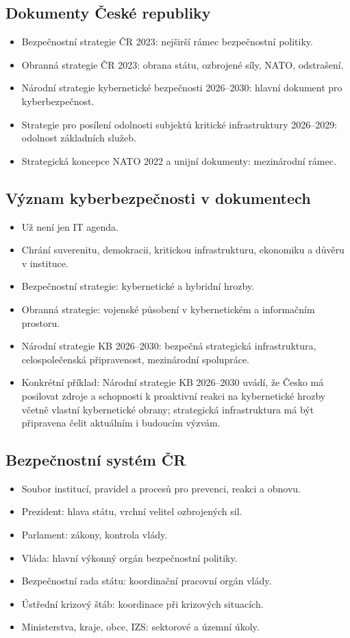 \documentclass[10pt,a4paper]{article}
\newcommand{\blok}[1]{\subsection*{#1}}
\begin{document}
\blok{Dokumenty České republiky}
\begin{itemize}
  \item Bezpečnostní strategie ČR 2023: nejširší rámec bezpečnostní politiky.
  \item Obranná strategie ČR 2023: obrana státu, ozbrojené síly, NATO, odstrašení.
  \item Národní strategie kybernetické bezpečnosti 2026--2030: hlavní dokument pro kyberbezpečnost.
  \item Strategie pro posílení odolnosti subjektů kritické infrastruktury 2026--2029: odolnost základních služeb.
  \item Strategická koncepce NATO 2022 a unijní dokumenty: mezinárodní rámec.
\end{itemize}

\blok{Význam kyberbezpečnosti v dokumentech}
\begin{itemize}
  \item Už není jen IT agenda.
  \item Chrání suverenitu, demokracii, kritickou infrastrukturu, ekonomiku a důvěru v instituce.
  \item Bezpečnostní strategie: kybernetické a hybridní hrozby.
  \item Obranná strategie: vojenské působení v kybernetickém a informačním prostoru.
  \item Národní strategie KB 2026--2030: bezpečná strategická infrastruktura, celospolečenská připravenost, mezinárodní spolupráce.
  \item Konkrétní příklad: Národní strategie KB 2026--2030 uvádí, že Česko má posilovat zdroje a schopnosti k proaktivní reakci na kybernetické hrozby včetně vlastní kybernetické obrany; strategická infrastruktura má být připravena čelit aktuálním i budoucím výzvám.
\end{itemize}

\blok{Bezpečnostní systém ČR}
\begin{itemize}
  \item Soubor institucí, pravidel a procesů pro prevenci, reakci a obnovu.
  \item Prezident: hlava státu, vrchní velitel ozbrojených sil.
  \item Parlament: zákony, kontrola vlády.
  \item Vláda: hlavní výkonný orgán bezpečnostní politiky.
  \item Bezpečnostní rada státu: koordinační pracovní orgán vlády.
  \item Ústřední krizový štáb: koordinace při krizových situacích.
  \item Ministerstva, kraje, obce, IZS: sektorové a územní úkoly.
\end{itemize}
\end{document}
